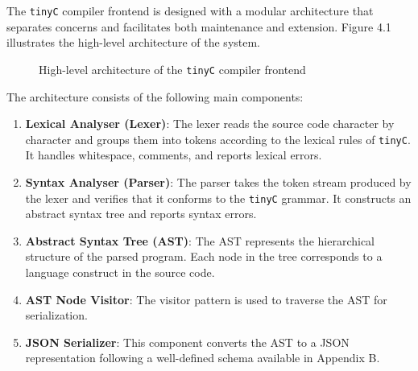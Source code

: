 The \texttt{tinyC} compiler frontend is designed with a modular architecture that separates concerns and facilitates both maintenance and extension. Figure 4.1 illustrates the high-level architecture of the system.

\begin{figure}[ht]
\centering
{}
\caption{High-level architecture of the \texttt{tinyC} compiler frontend}
\label{fig:architecture}
\end{figure}

The architecture consists of the following main components:

\begin{enumerate}
    \item \textbf{Lexical Analyser (Lexer)}: The lexer reads the source code character by character and groups them into tokens according to the lexical rules of \texttt{tinyC}. It handles whitespace, comments, and reports lexical errors.

    \item \textbf{Syntax Analyser (Parser)}: The parser takes the token stream produced by the lexer and verifies that it conforms to the \texttt{tinyC} grammar. It constructs an abstract syntax tree and reports syntax errors.

    \item \textbf{Abstract Syntax Tree (AST)}: The AST represents the hierarchical structure of the parsed program. Each node in the tree corresponds to a language construct in the source code.

    \item \textbf{AST Node Visitor}: The visitor pattern is used to traverse the AST for serialization.

    \item \textbf{JSON Serializer}: This component converts the AST to a JSON representation following a well-defined schema available in Appendix B.
\end{enumerate}


